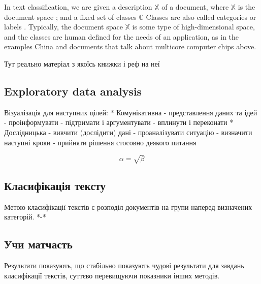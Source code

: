 In text classification, we are given a description
$\mathbb{X}$ of a document, where $\mathbb{X}$ is the document space ; and a fixed set
of classes  $\mathbb{C}$ Classes are also called categories or
labels . Typically, the document space  $\mathbb{X}$ is some type of high-dimensional space,
and the classes are human defined for the needs of an application, as in the examples China
and documents that talk about multicore computer chips above.


Тут реально матеріал з якоїсь книжки і реф на неї \cite{book:1}

\subsection{Exploratory data analysis}
Візуалізація для наступних цілей:
* Комунікативна
- представлення даних та ідей
- проінформувати
- підтримати і аргументувати
- вплинути і переконати
* Дослідницька
- вивчити (дослідити) дані
- проаналізувати ситуацію
- визначити наступні кроки
- прийняти рішення стосовно деякого питання

\begin{equation}
    \label{simple_equation}
    \alpha = \sqrt{ \beta }
\end{equation}

\subsection{Класифікація тексту}
Метою класифікації текстів є розподіл документів на групи наперед визначених категорій. *-*


\subsection{Учи матчасть}
Результати показують, що стабільно показують чудові результати для завдань класифікації
текстів, суттєво перевищуючи показники інших методів.

